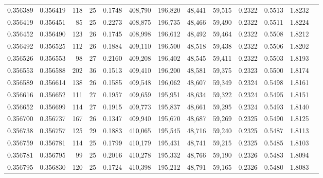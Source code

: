 \begin{tabular}{rrrrrrrrrrrrr}
0.356389 & 0.356419 &   118 &  25 &                                     0.1748 & 408,790 & 196,820 &  48,441 &  59,515 & 0.2322 & 0.5513 & 1.8232 \\
0.356419 & 0.356451 &    85 &  25 &                                     0.2273 & 408,875 & 196,735 &  48,466 &  59,490 & 0.2322 & 0.5511 & 1.8224 \\
0.356452 & 0.356490 &   123 &  26 &                                     0.1745 & 408,998 & 196,612 &  48,492 &  59,464 & 0.2322 & 0.5508 & 1.8212 \\
0.356492 & 0.356525 &   112 &  26 &                                     0.1884 & 409,110 & 196,500 &  48,518 &  59,438 & 0.2322 & 0.5506 & 1.8202 \\
0.356526 & 0.356553 &    98 &  27 &                                     0.2160 & 409,208 & 196,402 &  48,545 &  59,411 & 0.2322 & 0.5503 & 1.8193 \\
0.356553 & 0.356588 &   202 &  36 &                                     0.1513 & 409,410 & 196,200 &  48,581 &  59,375 & 0.2323 & 0.5500 & 1.8174 \\
0.356589 & 0.356614 &   138 &  26 &                                     0.1585 & 409,548 & 196,062 &  48,607 &  59,349 & 0.2324 & 0.5498 & 1.8161 \\
0.356616 & 0.356652 &   111 &  27 &                                     0.1957 & 409,659 & 195,951 &  48,634 &  59,322 & 0.2324 & 0.5495 & 1.8151 \\
0.356652 & 0.356699 &   114 &  27 &                                     0.1915 & 409,773 & 195,837 &  48,661 &  59,295 & 0.2324 & 0.5493 & 1.8140 \\
0.356700 & 0.356737 &   167 &  26 &                                     0.1347 & 409,940 & 195,670 &  48,687 &  59,269 & 0.2325 & 0.5490 & 1.8125 \\
0.356738 & 0.356757 &   125 &  29 &                                     0.1883 & 410,065 & 195,545 &  48,716 &  59,240 & 0.2325 & 0.5487 & 1.8113 \\
0.356759 & 0.356781 &   114 &  25 &                                     0.1799 & 410,179 & 195,431 &  48,741 &  59,215 & 0.2325 & 0.5485 & 1.8103 \\
0.356781 & 0.356795 &    99 &  25 &                                     0.2016 & 410,278 & 195,332 &  48,766 &  59,190 & 0.2326 & 0.5483 & 1.8094 \\
0.356795 & 0.356830 &   120 &  25 &                                     0.1724 & 410,398 & 195,212 &  48,791 &  59,165 & 0.2326 & 0.5480 & 1.8083 \\

\end{tabular}
